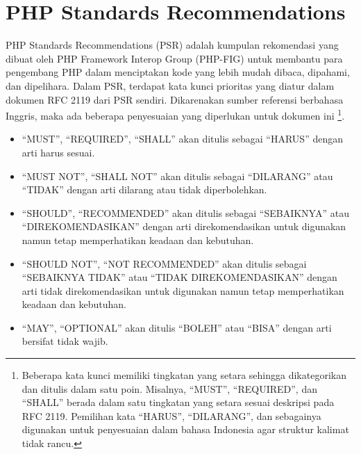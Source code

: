 \section{PHP Standards Recommendations}
\label{sec:psr}

PHP Standards Recommendations (PSR) adalah kumpulan rekomendasi yang dibuat oleh PHP Framework Interop Group (PHP-FIG) untuk membantu para pengembang PHP dalam menciptakan kode yang lebih mudah dibaca, dipahami, dan dipelihara. 
Dalam PSR, terdapat kata kunci prioritas yang diatur dalam dokumen RFC 2119 \cite{RFC2119} dari PSR sendiri. Dikarenakan sumber referensi berbahasa Inggris, maka ada beberapa penyesuaian yang diperlukan untuk dokumen ini \footnote{Beberapa kata kunci memiliki tingkatan yang setara sehingga dikategorikan dan ditulis dalam satu poin. Misalnya, ``MUST'', ``REQUIRED'', dan ``SHALL'' berada dalam satu tingkatan yang setara sesuai deskripsi pada RFC 2119. Pemilihan kata ``HARUS'', ``DILARANG'', dan sebagainya digunakan untuk penyesuaian dalam bahasa Indonesia agar struktur kalimat tidak rancu.}.

\begin{itemize}
	\item ``MUST'', ``REQUIRED'', ``SHALL'' akan ditulis sebagai ``HARUS'' dengan arti harus sesuai.
	\item ``MUST NOT'', ``SHALL NOT'' akan ditulis sebagai ``DILARANG'' atau ``TIDAK'' dengan arti dilarang atau tidak diperbolehkan.
	\item ``SHOULD'', ``RECOMMENDED'' akan ditulis sebagai ``SEBAIKNYA'' atau ``DIREKOMENDASIKAN'' dengan arti direkomendasikan untuk digunakan namun tetap memperhatikan keadaan dan kebutuhan.
	\item ``SHOULD NOT'', ``NOT RECOMMENDED'' akan ditulis sebagai ``SEBAIKNYA TIDAK'' atau ``TIDAK DIREKOMENDASIKAN'' dengan arti tidak direkomendasikan untuk digunakan namun tetap memperhatikan keadaan dan kebutuhan.
	\item ``MAY'', ``OPTIONAL'' akan ditulis ``BOLEH'' atau ``BISA'' dengan arti bersifat tidak wajib.
\end{itemize}


